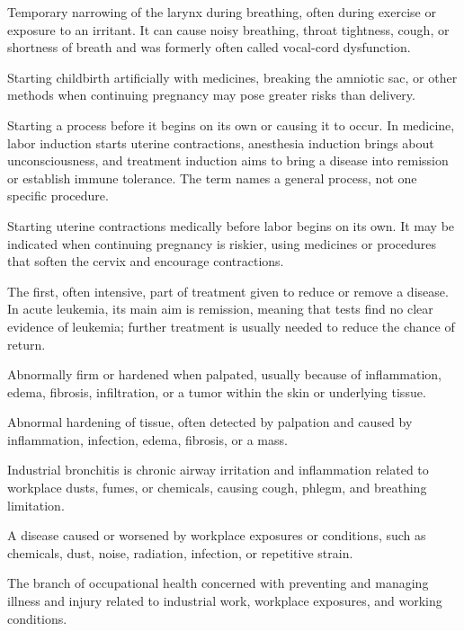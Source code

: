  Temporary narrowing of the larynx during breathing, often during exercise or exposure to an irritant. It can cause noisy breathing, throat tightness, cough, or shortness of breath and was formerly often called vocal-cord dysfunction.

 Starting childbirth artificially with medicines, breaking the amniotic sac, or other methods when continuing pregnancy may pose greater risks than delivery.

 Starting a process before it begins on its own or causing it to occur. In medicine, labor induction starts uterine contractions, anesthesia induction brings about unconsciousness, and treatment induction aims to bring a disease into remission or establish immune tolerance. The term names a general process, not one specific procedure.

 Starting uterine contractions medically before labor begins on its own. It may be indicated when continuing pregnancy is riskier, using medicines or procedures that soften the cervix and encourage contractions.

 The first, often intensive, part of treatment given to reduce or remove a disease. In acute leukemia, its main aim is remission, meaning that tests find no clear evidence of leukemia; further treatment is usually needed to reduce the chance of return.

 Abnormally firm or hardened when palpated, usually because of inflammation, edema, fibrosis, infiltration, or a tumor within the skin or underlying tissue.

 Abnormal hardening of tissue, often detected by palpation and caused by inflammation, infection, edema, fibrosis, or a mass.

 Industrial bronchitis is chronic airway irritation and inflammation related to workplace dusts, fumes, or chemicals, causing cough, phlegm, and breathing limitation.

 A disease caused or worsened by workplace exposures or conditions, such as chemicals, dust, noise, radiation, infection, or repetitive strain.

 The branch of occupational health concerned with preventing and managing illness and injury related to industrial work, workplace exposures, and working conditions.

